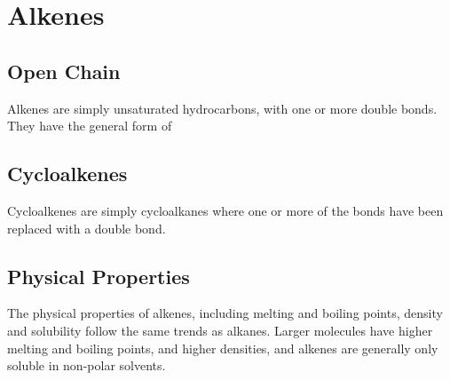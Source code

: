 

\pagebreak
\section{Alkenes}

\subsection{Open Chain}

	Alkenes are simply unsaturated hydrocarbons, with one or more double bonds. They have the general form of



\subsection{Cycloalkenes}

	Cycloalkenes are simply cycloalkanes where one or more of the  bonds have been replaced with a  double
	bond.





\subsection{Physical Properties}

	The physical properties of alkenes, including melting and boiling points, density and solubility follow the
	same trends as alkanes. Larger molecules have higher melting and boiling points, and higher densities, and alkenes are
	generally only soluble in non-polar solvents.


\pagebreak
